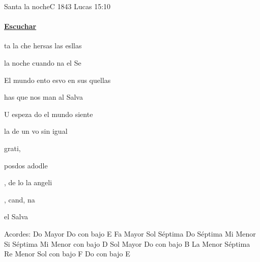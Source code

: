 \documentclass[12pt, spanish]{book}
\begin{document}
    \begin{song}{Santa la noche}{C}
    {1843} %
    {}
    {Lucas 15:10} %
    {}
        \ifChordBk
            \paragraph{\mbox{}\hfill\protect\href{https://open.spotify.com/intl-es/track/34OQJBdPvh88lHD6Oiuwc1}{Escuchar}\mbox{}\hfill}
        \fi

        \begin{SBOpGroup}
            ta la che hersas las esllas

            la noche cuando na el Se

            El mundo ento esvo en sus quellas

            has que  nos man al Salva

            U espeza do el mundo siente

            la  de un vo  sin igual
        \end{SBOpGroup}

        \begin{SBChorus}
             grati,

            posdos adodle

            , de lo  la  angeli

            , cand, na

            el Salva
        \end{SBChorus}

        \ifChordBk
        \begin{SBOpGroup}
            Acordes:\break
            \upchord{\C}\qquad Do Mayor \hfill
            \upchord{\CE}\qquad Do con bajo E \hfill\null\break
            \upchord{\F}\qquad Fa Mayor \hfill
            \upchord{\Gseven}\qquad Sol Séptima \hfill\null\break
            \upchord{\Cseven}\qquad Do Séptima \hfill
            \upchord{\Em}\qquad Mi Menor \hfill\null\break
            \upchord{\Bseven}\qquad Si Séptima \hfill\hfill
            \upchord{\EmD} Mi Menor con bajo D \hfill\null\break
            \upchord{\G}\qquad Sol Mayor \hfill
            \upchord{\CB}\qquad Do con bajo B \hfill\null\break
            \upchord{\Amseven}\qquad La Menor Séptima \hfill
            \upchord{\Dm}\qquad Re Menor \hfill\null\break
            \upchord{\GF}\qquad Sol con bajo F \hfill
            \upchord{\CE}\qquad Do con bajo E \hfill\null\break
        \end{SBOpGroup}
        \fi
    \end{song}
\end{document}
